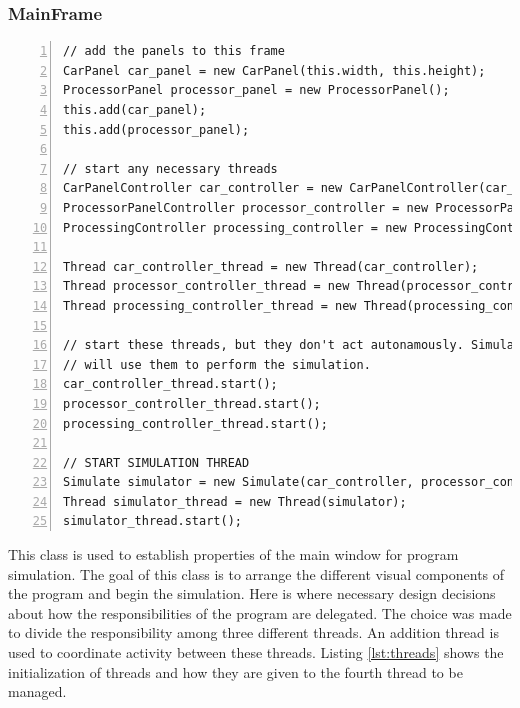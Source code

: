 \documentclass{article} %
\begin{document}
\subsubsection{MainFrame}
\begin{lstlisting}[float=*,caption={Setup Threads},label={lst:threads},numbers=left]
// add the panels to this frame
CarPanel car_panel = new CarPanel(this.width, this.height);
ProcessorPanel processor_panel = new ProcessorPanel();
this.add(car_panel);
this.add(processor_panel);

// start any necessary threads
CarPanelController car_controller = new CarPanelController(car_panel);
ProcessorPanelController processor_controller = new ProcessorPanelController(processor_panel);
ProcessingController processing_controller = new ProcessingController(scheduling_algorithm, n_processors);

Thread car_controller_thread = new Thread(car_controller);
Thread processor_controller_thread = new Thread(processor_controller);
Thread processing_controller_thread = new Thread(processing_controller);
    
// start these threads, but they don't act autonamously. Simulate thread
// will use them to perform the simulation.
car_controller_thread.start();
processor_controller_thread.start();
processing_controller_thread.start();

// START SIMULATION THREAD
Simulate simulator = new Simulate(car_controller, processor_controller, processing_controller, width, height);
Thread simulator_thread = new Thread(simulator);
simulator_thread.start();
\end{lstlisting}

This class is used to establish properties of the main window for program simulation.
The goal of this class is to arrange the different visual components of the program and begin the simulation.
Here is where necessary design decisions about how the responsibilities of the program are delegated.
The choice was made to divide the responsibility among three different threads. An addition thread is used to coordinate activity between these threads.
Listing \ref{lst:threads} shows the initialization of threads and how they are given to the fourth thread to be managed.
\end{document}
